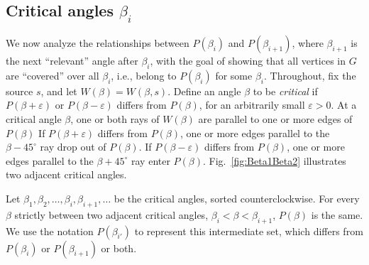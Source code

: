 \documentclass{cccg17}
\newcommand{\bluenew}[1]{{#1}}  %
\newcommand{\rednote}[1]{{}}  %
\newcommand{\seclab}[1]{\label{sec:#1}}
\newcommand{\figref}[1]{\ref{fig:#1}}
\def\e{{\varepsilon}}
\def\b{{\beta}}
\begin{document}
\rednote{Rev1: ``The first paragraph of the "Critical angles $\beta_i$" section is quite critical! I would rewrite it carefully. Some specific comments follow."}
\subsection{Critical angles $\b_i$}
\seclab{Critical}
We now 
analyze the relationships between $P(\b_i)$ and $P(\b_{i+1})$,
where $\b_{i+1}$ is the next ``relevant'' angle after $\b_i$,
with the goal of showing that all vertices in $G$ are
\bluenew{``covered'' over all $\b_i$,
i.e., belong to $P(\b_i)$ for some $\b_i$.}
\bluenew{Throughout, fix the source $s$, and let $W(\b) = W(\b,s)$.}
\rednote{JOR: Because reviewer wants $s$ or $v$ explicit.}
Define an angle $\b$ to be \emph{critical} if $P(\b+\e)$ or $P(\b-\e)$ differs
from $P(\b)$, for an arbitrarily small $\e > 0$.
\bluenew{
At a critical angle $\b$, one or both rays
of $W(\b)$ are parallel to one or more edges of $P(\b)$ %
}
\rednote{Rev1: ``It is not clear here what rays you are talking about. In fact, for these assertions to be true, you need to consider all the wedges centered at the vertices of $P(\beta)$ and not just the one centered at $s$. In these two sentences I would talk about angles; something like: "one or more edges with slope $\beta-45^\circ$ drop out of $P(\beta)$".
JOR: I don't agree with the reviewer. The reviewer is emphasizing $W(\b,v)$ as fundamentally
different from $W(\b) = W(\b,s)$, but that's not true for directions.
I think we just have to avoid implying that an edge lies directly on a bounding ray of the wedge.
So use ``parallel to" instead of ``lies along."
AL: Thank you, good fixes.
}
If $P(\b+\e)$ differs from $P(\b)$, one or more edges \bluenew{parallel to}
the $\b-45^\circ$ ray drop out of $P(\b)$.
If $P(\b-\e)$ differs from $P(\b)$, one or more edges \bluenew{parallel to}
the $\b+45^\circ$ ray enter $P(\b)$.
\bluenew{Fig.~\figref{Beta1Beta2} illustrates two adjacent critical angles.}

Let $\b_1, \b_2, \ldots, \b_i, \b_{i+1}, \ldots$ be the critical angles,
sorted counterclockwise.
For every $\b$ strictly between two adjacent critical angles,
$\b_i < \b < \b_{i+1}$, $P(\b)$ is the same.
We use the notation $P(\b_{i'})$ to represent this
intermediate set, which differs from $P(\b_i)$ or $P(\b_{i+1})$ or both.
\end{document}
